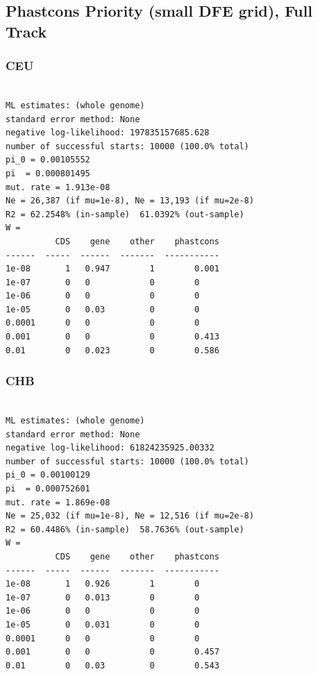 \documentclass[11pt]{article}
\begin{document}
\subsection{Phastcons Priority (small DFE grid), Full Track}
\subsubsection*{CEU}
\begin{minipage}{\linewidth}\begin{footnotesize}
\begin{verbatim}

ML estimates: (whole genome)
standard error method: None
negative log-likelihood: 197835157685.628
number of successful starts: 10000 (100.0% total)
pi_0 = 0.00105552
pi  = 0.000801495
mut. rate = 1.913e-08 
Ne = 26,387 (if mu=1e-8), Ne = 13,193 (if mu=2e-8)
R2 = 62.2548% (in-sample)  61.0392% (out-sample)
W = 
          CDS    gene    other    phastcons
------  -----  ------  -------  -----------
1e-08       1   0.947        1        0.001
1e-07       0   0            0        0
1e-06       0   0            0        0
1e-05       0   0.03         0        0
0.0001      0   0            0        0
0.001       0   0            0        0.413
0.01        0   0.023        0        0.586
\end{verbatim}
\end{footnotesize}\end{minipage}


\subsubsection*{CHB}
\begin{minipage}{\linewidth}\begin{footnotesize}
\begin{verbatim}

ML estimates: (whole genome)
standard error method: None
negative log-likelihood: 61824235925.00332
number of successful starts: 10000 (100.0% total)
pi_0 = 0.00100129
pi  = 0.000752601
mut. rate = 1.869e-08 
Ne = 25,032 (if mu=1e-8), Ne = 12,516 (if mu=2e-8)
R2 = 60.4486% (in-sample)  58.7636% (out-sample)
W = 
          CDS    gene    other    phastcons
------  -----  ------  -------  -----------
1e-08       1   0.926        1        0
1e-07       0   0.013        0        0
1e-06       0   0            0        0
1e-05       0   0.031        0        0
0.0001      0   0            0        0
0.001       0   0            0        0.457
0.01        0   0.03         0        0.543
\end{verbatim}
\end{footnotesize}\end{minipage}
\end{document}
